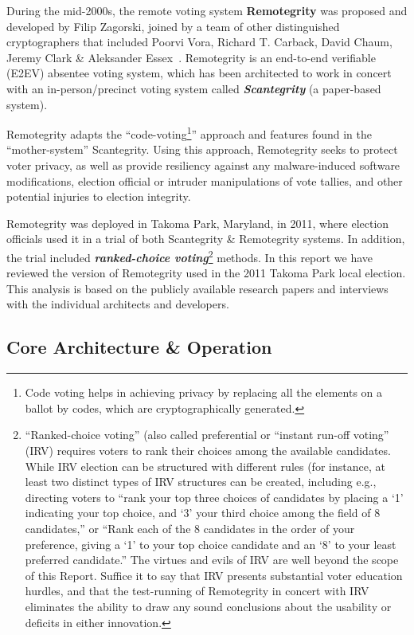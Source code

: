 During the mid-2000s, the remote voting system \textbf{Remotegrity
}was proposed and developed by Filip Zagorski, joined by a team of
other distinguished cryptographers that included Poorvi Vora, Richard
T. Carback, David Chaum, Jeremy Clark \& Aleksander
Essex~\cite{zagorski2013}. Remotegrity is an end-to-end verifiable
(E2EV) absentee voting system, which has been architected to work in
concert with an in-person/precinct voting system called
\textbf{\textit{Scantegrity }}(a paper-based system).

Remotegrity adapts the ``code-voting\footnote{Code voting helps in
  achieving privacy by replacing all the elements on a ballot by
  codes, which are cryptographically generated.}'' approach and
features found in the ``mother-system'' Scantegrity. Using this
approach, Remotegrity seeks to protect voter privacy, as well as
provide resiliency against any malware-induced software modifications,
election official or intruder manipulations of vote tallies, and other
potential injuries to election integrity.

Remotegrity was deployed in Takoma Park, Maryland, in 2011, where
election officials used it in a trial of both Scantegrity \&
Remotegrity systems. In addition, the trial included
\textbf{\textit{ranked-choice voting}}\footnote{``Ranked-choice
  voting'' (also called preferential or ``instant run-off voting''
  (IRV) requires voters to rank their choices among the available
  candidates. While IRV election can be structured with different
  rules (for instance, at least two distinct types of IRV structures
  can be created, including e.g., directing voters to ``rank your top
  three choices of candidates by placing a `1' indicating your top
  choice, and `3' your third choice among the field of 8 candidates,''
  or ``Rank each of the 8 candidates in the order of your preference,
  giving a `1' to your top choice candidate and an `8' to your least
  preferred candidate.'' The virtues and evils of IRV are well beyond
  the scope of this Report. Suffice it to say that IRV presents
  substantial voter education hurdles, and that the test-running of
  Remotegrity in concert with IRV eliminates the ability to draw any
  sound conclusions about the usability or deficits in either
  innovation.} methods. In this report we have reviewed the version of
Remotegrity used in the 2011 Takoma Park local election. This analysis
is based on the publicly available research papers and interviews with
the individual architects and developers.

\subsection{Core Architecture \& Operation}

